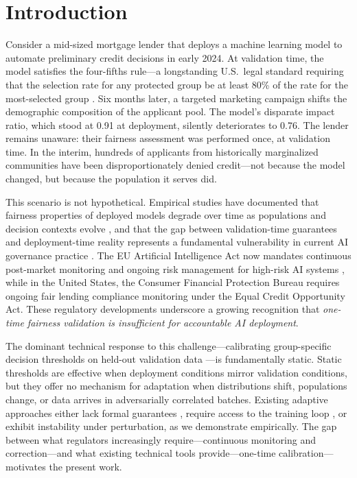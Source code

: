 \documentclass[letterpaper]{article} %
\theoremstyle{definition}
\begin{document}
\section{Introduction}
\label{sec:introduction}

Consider a mid-sized mortgage lender that deploys a machine learning model to automate preliminary credit decisions in early 2024. At validation time, the model satisfies the four-fifths rule---a longstanding U.S.\ legal standard requiring that the selection rate for any protected group be at least 80\% of the rate for the most-selected group \cite{biddle2006adverse}. Six months later, a targeted marketing campaign shifts the demographic composition of the applicant pool. The model's disparate impact ratio, which stood at 0.91 at deployment, silently deteriorates to 0.76. The lender remains unaware: their fairness assessment was performed once, at validation time. In the interim, hundreds of applicants from historically marginalized communities have been disproportionately denied credit---not because the model changed, but because the population it serves did.

This scenario is not hypothetical. Empirical studies have documented that fairness properties of deployed models degrade over time as populations and decision contexts evolve \cite{chen2025fairnessdrift}, and that the gap between validation-time guarantees and deployment-time reality represents a fundamental vulnerability in current AI governance practice \cite{singh2024fairness}. The EU Artificial Intelligence Act now mandates continuous post-market monitoring and ongoing risk management for high-risk AI systems \cite{euaiact2024}, while in the United States, the Consumer Financial Protection Bureau requires ongoing fair lending compliance monitoring under the Equal Credit Opportunity Act. These regulatory developments underscore a growing recognition that \emph{one-time fairness validation is insufficient for accountable AI deployment}.

The dominant technical response to this challenge---calibrating group-specific decision thresholds on held-out validation data \cite{hardt2016equality,menon2018cost}---is fundamentally static. Static thresholds are effective when deployment conditions mirror validation conditions, but they offer no mechanism for adaptation when distributions shift, populations change, or data arrives in adversarially correlated batches. Existing adaptive approaches either lack formal guarantees \cite{zhang2020fairness}, require access to the training loop \cite{roh2021fairbatch}, or exhibit instability under perturbation, as we demonstrate empirically. The gap between what regulators increasingly require---continuous monitoring and correction---and what existing technical tools provide---one-time calibration---motivates the present work.
\end{document}
